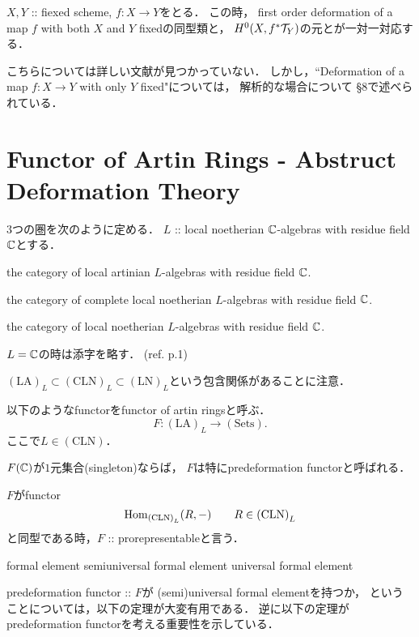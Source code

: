 \documentclass[a4paper]{jsarticle}
\newcommand{\LA}{\mathrm{(LA)}}
\newcommand{\LN}{\mathrm{(LN)}}
\newcommand{\CLN}{\mathrm{(CLN)}}
\begin{document}
    \begin{Thm}
        $X, Y$ :: fiexed scheme, 
        $f: X \to Y$をとる．
        この時，
        first order deformation of a map $f$ with both $X$ and $Y$ fixedの同型類と，
        $H^0(X, f^*\mathcal{T}_Y)$の元とが一対一対応する．
    \end{Thm}
    こちらについては詳しい文献が見つかっていない．
    しかし，``Deformation of a map $f: X \to Y$ with only $Y$ fixed"については，
    解析的な場合について\cite{GACII} \S 8で述べられている．

\section{Functor of Artin Rings - Abstruct Deformation Theory}
    $3$つの圏を次のように定める．
    $L$ :: local noetherian $\mathbb{C}$-algebras with residue field $\mathbb{C}$とする．
    \begin{description}[labelindent=1cm]
        \item[$\LA_{L}$:]  the category of local artinian $L$-algebras with residue field $\mathbb{C}$.
        \item[$\CLN_{L}$:] the category of complete local noetherian $L$-algebras with residue field $\mathbb{C}$.
        \item[$\LN_{L}$:]  the category of local noetherian $L$-algebras with residue field $\mathbb{C}$.
    \end{description}
    $L=\mathbb{C}$の時は添字を略す．
    (ref. \cite{DefAS} p.1)

    $\LA_L \subset \CLN_L \subset \LN_L$という包含関係があることに注意．

    \begin{Def}
        以下のようなfunctorをfunctor of artin ringsと呼ぶ．
        \[ F: \LA_L \to \mathrm{(Sets)}. \]
        ここで$L \in \CLN$．

        $F(\mathbb{C})$が$1$元集合(singleton)ならば，
        $F$は特にpredeformation functorと呼ばれる．

        $F$がfunctor
        \[ \Hom_{\CLN_L}(R, -) \qquad R \in \CLN_L \]
        と同型である時，$F$ :: prorepresentableと言う．

    \end{Def}

    \begin{Def}
        formal element
        semiuniversal formal element
        universal formal element
    \end{Def}

    predeformation functor :: $F$が
    (semi)universal formal elementを持つか，
    ということについては，以下の定理が大変有用である．
    逆に以下の定理がpredeformation functorを考える重要性を示している．

    \begin{Thm}
    \end{Thm}



\end{document}
